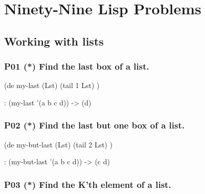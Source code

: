 %
%
%


\chapter{Ninety-Nine Lisp Problems}
\label{cha:ninety-nine-lisp-problems}

\section*{Working with lists}
\label{sec:99-problems-}

\subsection*{{P01} (*) Find the last box of a list.}
\label{sec:99-problems-P01}

\begin{wideverbatim}

(de my-last (Lst)
   (tail 1 Lst) )

\end{wideverbatim}

\begin{wideverbatim}
   : (my-last '(a b c d))
   -> (d)
\end{wideverbatim}

\subsection*{{P02} (*) Find the last but one box of a
list.}
\label{sec:99-problems-P02}

\begin{wideverbatim}

(de my-but-last (Lst)
   (tail 2 Lst) )

\end{wideverbatim}

\begin{wideverbatim}
   : (my-but-last '(a b c d))
   -> (c d)
\end{wideverbatim}

\subsection*{{P03} (*) Find the K'th element of a list.}
\label{sec:99-problems-P03}

